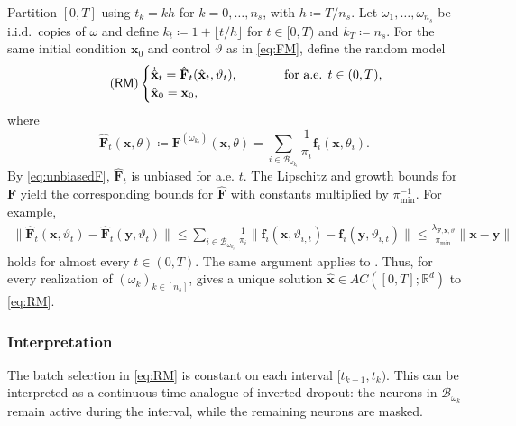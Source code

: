 \documentclass[twoside,11pt]{article}
\theoremstyle{plain}
\def\R{\mathbb R}
\newcommand{\bff}{\mathbf{f}}
\newcommand{\bfF}{\mathbf{F}}
\newcommand{\bfx}{\mathbf{x}}
\newcommand{\bfy}{\mathbf{y}}
\begin{document}
Partition $[0,T]$ using $t_k=kh$ for $k=0,\dots,n_s$, with $h\coloneqq T/n_s$. Let $\omega_1,\dots,\omega_{n_s}$ be i.i.d.\ copies of $\omega$ and define $k_t\coloneqq 1+\lfloor t/h\rfloor$ for $t\in[0,T)$ and $k_T\coloneqq n_s$. For the same initial condition $\bfx_0$ and control $\vartheta$ as in \eqref{eq:FM}, define the random model
\begin{align}\tag{$\mathsf{RM}$}\label{eq:RM}
\begin{cases}
\dot{\hat{\bfx}}_t =\hat{\bfF}_t(\hat{\bfx}_t,\vartheta_t), \hspace{1cm}&\text{for a.e. }t\in(0,T),\\
\hat{\bfx}_0=\bfx_0,
\end{cases}
\end{align}
where
\begin{equation}\label{eq:hatFkt}
\hat{\bfF}_t(\bfx,\theta) \coloneqq \bfF^{(\omega_{k_t})}(\bfx,\theta) = \sum_{i\in\mathcal B_{\omega_{k_t}}} \frac{1}{\pi_i}\bff_i(\bfx,\theta_i).
\end{equation}
By \eqref{eq:unbiasedF}, $\hat{\bfF}_t$ is unbiased for a.e. $t$. The Lipschitz and growth bounds for $\bfF$ yield the corresponding bounds for $\hat{\bfF}$ with constants multiplied by $\pi_{\min}^{-1}$. For example,
\begin{equation*}
\begin{aligned}
\|\hat{\bfF}_t(\bfx,\vartheta_t) -\hat{\bfF}_t(\bfy,\vartheta_t)\| 
\le \sum_{i\in\mathcal B_{\omega_{k_t}}} \frac{1}{\pi_i} \|\bff_i(\bfx,\vartheta_{i,t}) -\bff_i(\bfy,\vartheta_{i,t})\| \le \frac{\lambda_{\bfF,\bfx,\vartheta}}{\pi_{\min}} \|\bfx-\bfy\|
\end{aligned}
\end{equation*}
holds for almost every $t\in(0,T)$. The same argument applies to . Thus, for every realization of $(\omega_k)_{k\in[n_s]}$,  gives a unique solution $\hat{\bfx}\in{AC}([0,T];\R^d)$ to \eqref{eq:RM}.

\subsubsection*{Interpretation}
The batch selection in \eqref{eq:RM} is constant on each interval $[t_{k-1},t_k)$. This can be interpreted as a continuous-time analogue of inverted dropout: the neurons in $\mathcal B_{\omega_k}$ remain active during the interval, while the remaining neurons are masked.

\end{document}
